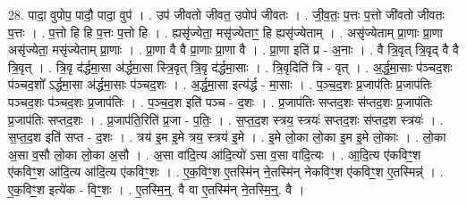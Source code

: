 \documentclass[17pt]{extarticle}
\begin{document}
28. पादा॒ वुपोप॒ पादौ॒ पादा॒ वुप॑ । . उप॑ जीवतो जीवत॒ उपोप॑ जीवतः । . जी॒व॒तः॒ प॒त्तः प॒त्तो जी॑वतो जीवतः प॒त्तः । . प॒त्तो हि हि प॒त्तः प॒त्तो हि । . ह्यसृ॑ज्येता॒ मसृ॑ज्येताꣳ॒॒ हि ह्यसृ॑ज्येताम् । . असृ॑ज्येताम् प्रा॒णाः प्रा॒णा असृ॑ज्येता॒ मसृ॑ज्येताम् प्रा॒णाः । . प्रा॒णा वै वै प्रा॒णाः प्रा॒णा वै । . प्रा॒णा इति॑ प्र - अ॒नाः । . वै त्रि॒वृत् त्रि॒वृद् वै वै त्रि॒वृत् । . त्रि॒वृ द॑र्द्धमा॒सा अ॑र्द्धमा॒सा स्त्रि॒वृत् त्रि॒वृ द॑र्द्धमा॒साः । . त्रि॒वृदिति॑ त्रि - वृत् । . अ॒र्द्ध॒मा॒साः प॑ञ्चद॒शः प॑ञ्चद॒शो᳚ ऽर्द्धमा॒सा अ॑र्द्धमा॒साः प॑ञ्चद॒शः । . अ॒र्द्ध॒मा॒सा इत्य॑र्द्ध - मा॒साः । . प॒ञ्च॒द॒शः प्र॒जाप॑तिः प्र॒जाप॑तिः पञ्चद॒शः प॑ञ्चद॒शः प्र॒जाप॑तिः । . प॒ञ्च॒द॒श इति॑ पञ्च - द॒शः । . प्र॒जाप॑तिः सप्तद॒शः स॑प्तद॒शः प्र॒जाप॑तिः प्र॒जाप॑तिः सप्तद॒शः । . प्र॒जाप॑ति॒रिति॑ प्र॒जा - प॒तिः॒ । . स॒प्त॒द॒श स्त्रय॒ स्त्रयः॑ सप्तद॒शः स॑प्तद॒श स्त्रयः॑ । . स॒प्त॒द॒श इति॑ सप्त - द॒शः । . त्रय॑ इ॒म इ॒मे त्रय॒ स्त्रय॑ इ॒मे । . इ॒मे लो॒का लो॒का इ॒म इ॒मे लो॒काः । . लो॒का अ॒सा व॒सौ लो॒का लो॒का अ॒सौ । . अ॒सा वा॑दि॒त्य आ॑दि॒त्यो॑ ऽसा व॒सा वा॑दि॒त्यः । . आ॒दि॒त्य ए॑कविꣳ॒॒श ए॑कविꣳ॒॒श आ॑दि॒त्य आ॑दि॒त्य ए॑कविꣳ॒॒शः । . ए॒क॒विꣳ॒॒श ए॒तस्मि॑न् ने॒तस्मि॑न् नेकविꣳ॒॒श ए॑कविꣳ॒॒श ए॒तस्मिन्न्॑ । . ए॒क॒विꣳ॒॒श इत्ये॑क - विꣳ॒॒शः । . ए॒तस्मि॒न्॒. वै वा ए॒तस्मि॑न् ने॒तस्मि॒न्॒. वै । \newline
\end{document}
